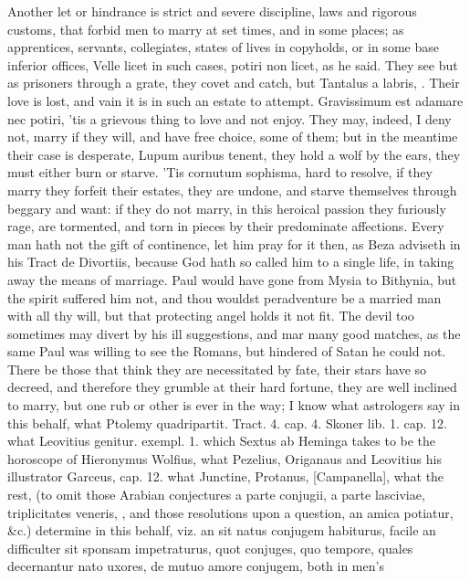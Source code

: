 Another let or hindrance is strict and severe discipline, laws and
rigorous customs, that forbid men to marry at set times, and in some
places; as apprentices, servants, collegiates, states of lives in
copyholds, or in some base inferior offices, Velle licet in such
cases, potiri non licet, as he said. They see but as prisoners through
a grate, they covet and catch, but Tantalus a labris, \etc{}. Their love is
lost, and vain it is in such an estate to attempt. Gravissimum
est adamare nec potiri, 'tis a grievous thing to love and not enjoy.
They may, indeed, I deny not, marry if they will, and have free choice,
some of them; but in the meantime their case is desperate, Lupum
auribus tenent, they hold a wolf by the ears, they must either burn or
starve. 'Tis cornutum sophisma, hard to resolve, if they marry they
forfeit their estates, they are undone, and starve themselves through
beggary and want: if they do not marry, in this heroical passion they
furiously rage, are tormented, and torn in pieces by their predominate
affections. Every man hath not the gift of continence, let him
pray for it then, as Beza adviseth in his Tract de Divortiis,
because God hath so called him to a single life, in taking away the
means of marriage. Paul would have gone from Mysia to Bithynia,
but the spirit suffered him not, and thou wouldst peradventure be a
married man with all thy will, but that protecting angel holds it not
fit. The devil too sometimes may divert by his ill suggestions, and mar
many good matches, as the same Paul was willing to see the
Romans, but hindered of Satan he could not. There be those that think
they are necessitated by fate, their stars have so decreed, and
therefore they grumble at their hard fortune, they are well inclined to
marry, but one rub or other is ever in the way; I know what astrologers
say in this behalf, what Ptolemy quadripartit. Tract. 4. cap. 4. Skoner
lib. 1. cap. 12. what Leovitius genitur. exempl. 1. which Sextus ab
Heminga takes to be the horoscope of Hieronymus Wolfius, what Pezelius,
Origanaus and Leovitius his illustrator Garceus, cap. 12. what
Junctine, Protanus, [Campanella], what the rest, (to omit those Arabian
conjectures a parte conjugii, a parte lasciviae, triplicitates veneris,
\etc{}, and those resolutions upon a question, an amica potiatur, \&c.)
determine in this behalf, viz. an sit natus conjugem habiturus, facile
an difficulter sit sponsam impetraturus, quot conjuges, quo tempore,
quales decernantur nato uxores, de mutuo amore conjugem, both in men's
